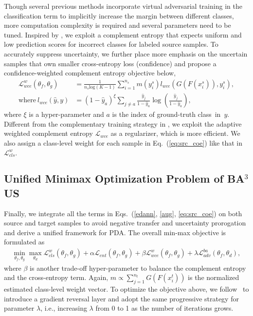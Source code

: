 \documentclass[runningheads]{llncs}
\begin{document}
Though several previous methods \cite{kumar2018co,shu2018dirt} incorporate virtual adversarial training \cite{miyato2018virtual} in the classification term to implicitly increase the margin between different classes, more computation complexity is required and several parameters need to be tuned.
Inspired by \cite{chen2019complement}, we exploit a complement entropy that expects uniform and low prediction scores for incorrect classes for labeled source samples.
To accurately suppress uncertainty, we further place more emphasis on the uncertain samples that own smaller cross-entropy loss (confidence) and propose a confidence-weighted complement entropy objective below,
\begin{equation}
\begin{aligned}
\mathcal{L}_{wce}^{w}(\theta_f, \theta_g) &= \frac{1}{n_s \text{log}(K-1)}\sum\nolimits_{i=1}^{n_s} m(y_i^s) l_{wce}(G(F(x_i^s)), y_i^s),\\
\text{where}\ l_{wce}(\hat{y}, y) &= (1-\hat{y}_a)^\xi \sum\nolimits_{j \not = a} \frac{\hat{y}_j}{1-\hat{y}_a} \log(\frac{\hat{y}_j}{1-\hat{y}_a}),
\end{aligned}
\label{eq:src_coe}
\end{equation}
where $\xi$ is a hyper-parameter and $a$ is the index of ground-truth class~in~$y$.
Different from the complementary training strategy in \cite{chen2019complement}, we exploit the adaptive weighted complement entropy $\mathcal{L}_{wce}$ as a regularizer, which is more efficient.
We also assign a class-level weight for each sample in Eq.~(\ref{eq:src_coe}) like that in $\mathcal{L}_{cls}^{w}$.
	

\subsection{Unified Minimax Optimization Problem of BA$^3$US}
Finally, we integrate all the terms in Eqs.~(\ref{edann}, \ref{aug}, \ref{eq:src_coe}) on both source and target samples to avoid negative transfer and uncertainty prorogation and derive a unified framework for PDA. The overall min-max objective is formulated as
\begin{equation}
\begin{aligned}
\min\limits_{\theta_f, \theta_g} \max\limits_{\theta_d} \mathcal{L}^w_{cls}(\theta_f,\theta_g) + \alpha \mathcal{L}_{ent}(\theta_f,\theta_g) + \beta \mathcal{L}^w_{wce}(\theta_f, \theta_g) + \lambda \mathcal{L}_{adv}^{ba}(\theta_f,\theta_d),
\end{aligned}
\label{ours}
\end{equation}
where $\beta$ is another trade-off hyper-parameter to balance the complement entropy and the cross-entropy term.
Again, $m \propto \sum\nolimits_{j=1}^{n_t} G(F(x_i^t))$ is the normalized estimated class-level weight vector.
To optimize the objective above, we follow~\cite{ganin2015unsupervised} to introduce a gradient reversal layer and adopt the same progressive strategy for parameter $\lambda$, i.e., increasing $\lambda$ from 0 to 1 as the number of iterations grows.
\end{document}
